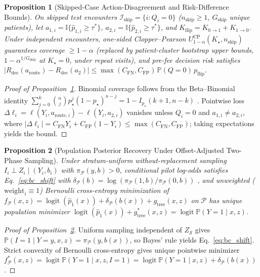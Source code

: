 \documentclass[11pt]{article}
\newtheorem{proposition}{Proposition}
\theoremstyle{remark}
\begin{document}
\begin{proposition}[Skipped-Case Action-Disagreement and Risk-Difference Bounds]
\label{prop:skip_safety}
On skipped test encounters $\mathcal{I}_{\text{skip}} = \{i : Q_i = 0\}$ ($n_{\text{skip}} \ge 1$, $G_{\text{skip}}$ unique patients), let $a_{1,i} = \mathbb{I}\{\hat{p}_{1,i} \ge \tau^*\}$, $a_{2,i} = \mathbb{I}\{\hat{p}_{2,i} \ge \tau^*\}$, and $K_{\text{flip}} = K_{0\to 1} + K_{1\to 0}$. Under independent encounters, one-sided Clopper--Pearson $U_{1-\alpha}^{\text{CP}}(K_\star, n_{\text{skip}})$ \citep{clopper1934use} guarantees coverage $\ge 1-\alpha$ (replaced by patient-cluster bootstrap upper bounds, $1-\alpha^{1/G_{\text{skip}}}$ at $K_\star=0$, under repeat visits), and pre-fee decision risk satisfies $|R_{\text{dec}}(a_{\text{route}}) - R_{\text{dec}}(a_2)| \le \max(C_{\text{FN}}, C_{\text{FP}})\,\mathbb{P}(Q=0)\,p_{\text{flip}}$.
\end{proposition}

\begin{proof}[Proof of Proposition~\ref{prop:skip_safety}]
Binomial coverage follows from the Beta--Binomial identity $\sum_{j=0}^k \binom{n}{j}p_\star^j(1-p_\star)^{n-j} = 1 - I_{p_\star}(k+1,n-k)$ \citep{clopper1934use}. Pointwise loss $\Delta\ell_i = \ell(Y_i, a_{\text{route},i}) - \ell(Y_i, a_{2,i})$ vanishes unless $Q_i=0$ and $a_{1,i}\ne a_{2,i}$, where $|\Delta\ell_i| = C_{\text{FN}}Y_i + C_{\text{FP}}(1-Y_i) \le \max(C_{\text{FN}}, C_{\text{FP}})$; taking expectations yields the bound.
\end{proof}

\begin{proposition}[Population Posterior Recovery Under Offset-Adjusted Two-Phase Sampling]
\label{prop:breslow_cain}
Under stratum-uniform without-replacement sampling $I_i \perp Z_i \mid (Y_i, b_i)$ with $\pi_{\mathcal{P}}(y,b) > 0$, conditional pilot log-odds satisfies Eq.~\eqref{eq:bc_shift} with $\delta_{\mathcal{P}}(b) = \log(\pi_{\mathcal{P}}(1,b)/\pi_{\mathcal{P}}(0,b))$ \citep{breslow1988logistic}, and unweighted ($\text{weight}_i \equiv 1$) Bernoulli cross-entropy minimization of $f_{\mathcal{P}}(x,z) = \operatorname{logit}(\hat{p}_1(x)) + \delta_{\mathcal{P}}(b(x)) + g_{\text{tree}}(x,z)$ on $\mathcal{P}$ has unique population minimizer $\operatorname{logit}(\hat{p}_1(x)) + g_{\text{tree}}^*(x,z) = \operatorname{logit}\mathbb{P}(Y=1 \mid x,z)$.
\end{proposition}

\begin{proof}[Proof of Proposition~\ref{prop:breslow_cain}]
Uniform sampling independent of $Z_{\mathcal{S}}$ gives $\mathbb{P}(I=1 \mid Y=y, x, z) = \pi_{\mathcal{P}}(y,b(x))$, so Bayes' rule yields Eq.~\eqref{eq:bc_shift}. Strict convexity of Bernoulli cross-entropy gives unique pointwise minimizer $f_{\mathcal{P}}^*(x,z) = \operatorname{logit}\mathbb{P}(Y=1\mid x,z,I=1) = \operatorname{logit}\mathbb{P}(Y=1\mid x,z) + \delta_{\mathcal{P}}(b(x))$.
\end{proof}
\end{document}
